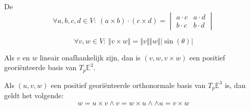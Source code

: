 \documentclass[main.tex]{subfiles}
\begin{document}
\begin{st}
  De \\
  \[
  \forall a,b,c,d \in V:\ (a\times b) \cdot (c \times d) =
  \begin{vmatrix}
    a \cdot c & a \cdot d\\
    b \cdot c & b \cdot d
  \end{vmatrix}
  \]
\end{st}

\begin{st}
  \[ \forall v,w \in V:\ \Vert v \times w\Vert = \Vert v \Vert \Vert w \Vert |\sin(\theta)| \]
\end{st}

\begin{st}
  Als $v$ en $w$ lineair onafhankelijk zijn, dan is $(v,w,v\times w)$ een positief geori\"enteerde basis van $T_{p}\mathbb{E}^{3}$.
\end{st}

\begin{st}
  Als $(u,v,w)$ een positief geori\"enteerde orthonormale basis van $T_{p}\mathbb{E}^{3}$ is, dan geldt het volgende:
  \[ w = u \times v \wedge v = w \times u \wedge \wedge u = v \times w \]
\end{st}
\end{document}
